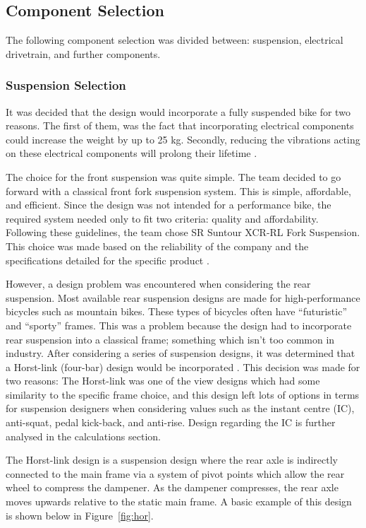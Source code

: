 \documentclass[a4paper,11pt]{article}
\begin{document}
\subsection{Component Selection}
\label{sec:comps}

The following component selection was divided between: suspension, electrical drivetrain, and further components.

\subsubsection{Suspension Selection}

It was decided that the design would incorporate a fully suspended bike for two reasons. The first of them, was the fact that incorporating electrical components could increase the weight by up to 25 kg. Secondly, reducing the vibrations acting on these electrical components will prolong their lifetime \cite{muetz07}.

The choice for the front suspension was quite simple. The team decided to go forward with a classical front fork suspension system. This is simple, affordable, and efficient. Since the design was not intended for a performance bike, the required system needed only to fit two criteria: quality and affordability. Following these guidelines, the team chose SR Suntour XCR-RL Fork Suspension. This choice was made based on the reliability of the company and the specifications detailed for the specific product \cite{suntour}. 

However, a design problem was encountered when considering the rear suspension. Most available rear suspension designs are made for high-performance bicycles such as mountain bikes. These types of bicycles often have ``futuristic'' and ``sporty'' frames. This was a problem because the design had to incorporate rear suspension into a classical frame; something which isn't too common in industry. After considering a series of suspension designs, it was determined that a Horst-link (four-bar) design would be incorporated \cite{stott}. This decision was made for two reasons: The Horst-link was one of the view designs which had some similarity to the specific frame choice, and this design left lots of options in terms for suspension designers when considering values such as the instant centre (IC), anti-squat, pedal kick-back, and anti-rise. Design regarding the IC is further analysed in the calculations section. 

The Horst-link design is a suspension design where the rear axle is indirectly connected to the main frame via a system of pivot points which allow the rear wheel to compress the dampener. As the dampener compresses, the rear axle moves upwards relative to the static main frame. A basic example of this design is shown below in Figure~\ref{fig:hor}.
\end{document}
